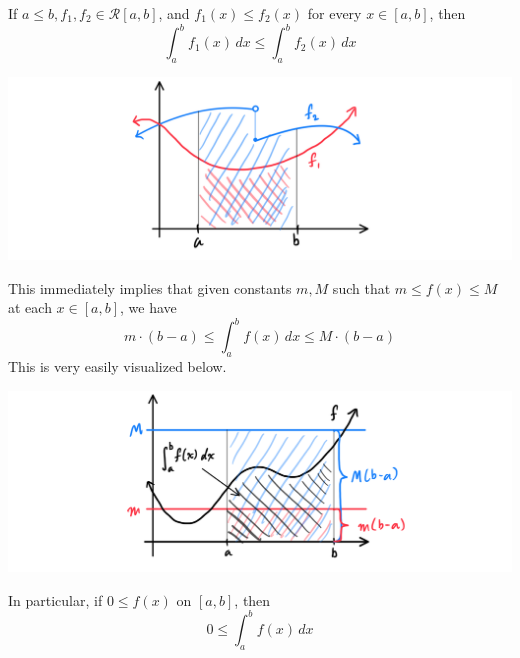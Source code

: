     \begin{lemma}
      If $a \leq b, f_1, f_2 \in \mathcal{R}[a, b]$, and $f_1 (x) \leq f_2 (x)$ for every $x \in [a, b]$, then
      \[\int_a^b f_1 (x)\,dx \leq \int_a^b f_2 (x)\,dx\]
      \begin{center}
          \includegraphics[scale=0.27]{img/Monotonicity_of_Integral.PNG}
      \end{center}
      This immediately implies that given constants $m, M$ such that $m \leq f(x) \leq M$ at each $x \in [a, b]$, we have
      \[m \cdot (b - a) \leq \int_a^b f(x)\,dx \leq M \cdot (b-a)\]
      This is very easily visualized below. 
      \begin{center}
          \includegraphics[scale=0.27]{img/Monotonicity_of_Intergral_2.PNG}
      \end{center}
      In particular, if $0 \leq f(x)$ on $[a, b]$, then
      \[0 \leq \int_a^b f(x)\,dx\]
    \end{lemma}

